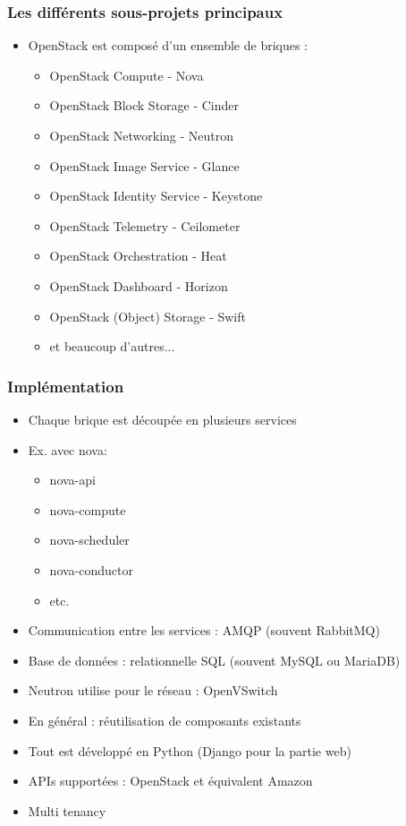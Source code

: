   \begin{frame}
    \frametitle{Les différents sous-projets principaux}
    \begin{itemize}
      \item OpenStack est composé d'un ensemble de briques :
      \begin{itemize}
        \item OpenStack Compute - Nova
        \item OpenStack Block Storage - Cinder
        \item OpenStack Networking - Neutron
        \item OpenStack Image Service - Glance
        \item OpenStack Identity Service - Keystone
        \item OpenStack Telemetry - Ceilometer
        \item OpenStack Orchestration - Heat
        \item OpenStack Dashboard - Horizon
        \item OpenStack (Object) Storage - Swift
        \item et beaucoup d'autres...
      \end{itemize}
    \end{itemize}
  \end{frame}

  \begin{frame}
    \frametitle{Implémentation}
    \begin{itemize}
      \item Chaque brique est découpée en plusieurs services
      \item Ex. avec nova:
        \begin{itemize}
          \item nova-api
          \item nova-compute
          \item nova-scheduler
          \item nova-conductor
          \item etc.
        \end{itemize}
      \item Communication entre les services : AMQP (souvent RabbitMQ)
      \item Base de données : relationnelle SQL (souvent MySQL ou MariaDB)
      \item Neutron utilise pour le réseau : OpenVSwitch
      \item En général : réutilisation de composants existants
      \item Tout est développé en Python (Django pour la partie web)
      \item APIs supportées : OpenStack et équivalent Amazon
      \item Multi tenancy
    \end{itemize}
  \end{frame}


